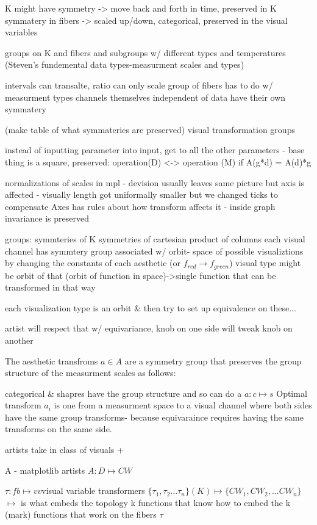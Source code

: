 \documentclass[letterpaper,onecolumn,titlepage]{Ythesis}
\begin{document}
K might have symmetry -> move back and forth in time, preserved in K
symmatery in fibers -> scaled up/down, categorical,
preserved in the visual variables

groups on K and fibers and subgroups w/ different types and temperatures (Steven's fundemental data types-measurment scales and types)

intervals can transalte, ratio can only scale
group of fibers has to do w/ measurment types
channels themselves independent of data have their own symmatery

(make table of what symmateries are preserved)
visual transformation groups

instead of inputting parameter into input, get to all the other parameters - base thing is a square, 
preserved: operation(D) <-> operation (M)
if A(g*d) = A(d)*g

normalizations of scales in mpl - devision usually leaves same picture but axis is affected - visually length got uniformally smaller but we changed ticks to compensate
Axes has rules about how transform affects it - inside graph invariance is preserved

groups:
symmteries of K
symmetries of cartesian product of columns
each visual channel has symmtery group associated w/
orbit- space of possible visualiztions by changing the constants of each aesthetic (or $f_{red} \rightarrow f_{green}$)  
visual type might be orbit of that (orbit of function in space)->single function that can be transformed in that way 

each visualization type is an orbit \& then try to set up equivalence on these...

artist will respect that w/ equivariance, knob on one side will tweak knob on another



The aesthetic transfroms $a \in A$ are a symmetry group that preserves the group structure of the measurment scales as follows: 

categorical \& shapres have the group structure and so can do a $a: c \mapsto s$
Optimal transform $a_{i}$ is one from a measurment space to a visual channel where both sides have the same group transforms-
because equivaraince requires having the same transforms on the same side. 

artists take in class of visuals + 

A - matplotlib artists 
$A: D \mapsto CW$

$\tau: fb \mapsto vv $visual variable transformers
$\{\tau_{1}, \tau_{2}...\tau_{n}\}(K)\mapsto \{CW_{1}, CW_{2}, ...CW_{n}\}$ 
$\mapsto$ is what embeds the topology k 
functions that know how to embed the k (mark)
functions that work on the fibers $\tau$
\end{document}
